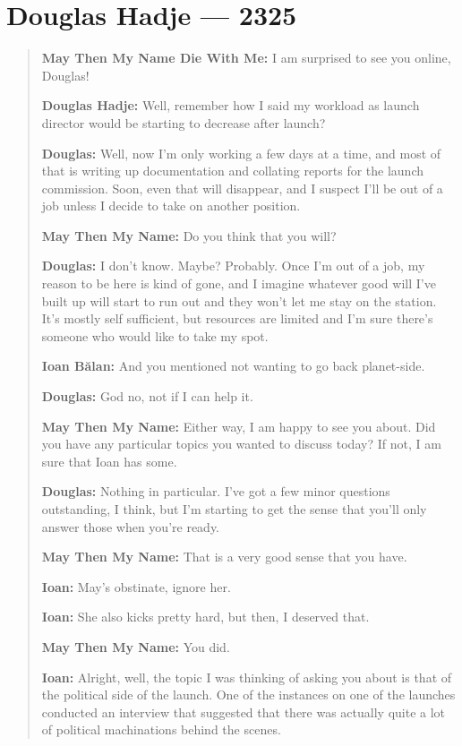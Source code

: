 \hypertarget{douglas-hadje-2325}{%
\chapter{Douglas Hadje — 2325}\label{douglas-hadje-2325}}

\begin{quote}
\textbf{May Then My Name Die With Me:} I am surprised to see you online, Douglas!

\textbf{Douglas Hadje:} Well, remember how I said my workload as launch director would be starting to decrease after launch?

\textbf{Douglas:} Well, now I'm only working a few days at a time, and most of that is writing up documentation and collating reports for the launch commission. Soon, even that will disappear, and I suspect I'll be out of a job unless I decide to take on another position.

\textbf{May Then My Name:} Do you think that you will?

\textbf{Douglas:} I don't know. Maybe? Probably. Once I'm out of a job, my reason to be here is kind of gone, and I imagine whatever good will I've built up will start to run out and they won't let me stay on the station. It's mostly self sufficient, but resources are limited and I'm sure there's someone who would like to take my spot.

\textbf{Ioan Bălan:} And you mentioned not wanting to go back planet-side.

\textbf{Douglas:} God no, not if I can help it.

\textbf{May Then My Name:} Either way, I am happy to see you about. Did you have any particular topics you wanted to discuss today? If not, I am sure that Ioan has some.

\textbf{Douglas:} Nothing in particular. I've got a few minor questions outstanding, I think, but I'm starting to get the sense that you'll only answer those when you're ready.

\textbf{May Then My Name:} That is a very good sense that you have.

\textbf{Ioan:} May's obstinate, ignore her.

\textbf{Ioan:} She also kicks pretty hard, but then, I deserved that.

\textbf{May Then My Name:} You did.

\textbf{Ioan:} Alright, well, the topic I was thinking of asking you about is that of the political side of the launch. One of the instances on one of the launches conducted an interview that suggested that there was actually quite a lot of political machinations behind the scenes.


\end{quote}
